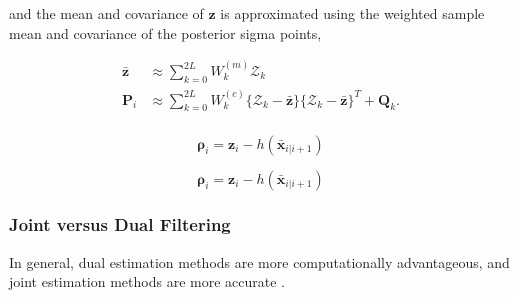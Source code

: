 and the mean and covariance of $\bm{z}$ is approximated using the weighted
sample mean and covariance of the posterior sigma points,

\begin{equation}
    \begin{aligned}
        \bar{\bm{z}} & \approx \sum_{k=0}^{2L} W_k^{(m)}\mathcal{Z}_k                                                   \\
        \bm{P}_i     & \approx \sum_{k=0}^{2L} W_k^{(c)}\{\mathcal{Z}_k-\bar{\bm{z}}\}\{\mathcal{Z}_k-\bar{\bm{z}}\}^T +\bm{Q}_k. \\
    \end{aligned}
\end{equation}



\begin{equation}
   \bm{\rho}_i = \bm{z}_i - h(\bar{\bm{x}}_{i|i+1})
\end{equation}



\begin{equation}
   \bm{\rho}_i = \bm{z}_i - h(\bar{\bm{x}}_{i|i+1})
\end{equation}


\subsubsection{Joint versus Dual Filtering}

In general, dual estimation methods are more computationally advantageous, and
joint estimation methods are more accurate \cite{Plett2005}.




